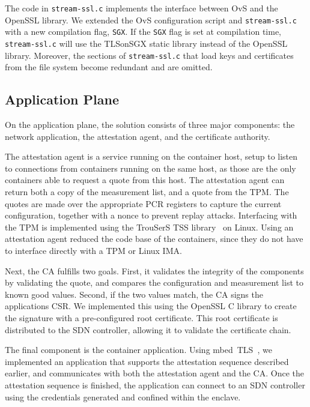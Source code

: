 {The code in \texttt{stream-ssl.c} implements the interface between OvS and the OpenSSL library. 
We extended the OvS configuration script and \texttt{stream-ssl.c} with a new compilation flag, \texttt{SGX}.
If the \texttt{SGX} flag is set at compilation time, \texttt{stream-ssl.c} will use the TLSonSGX static library instead of the OpenSSL library.
Moreover, the sections of \texttt{stream-ssl.c} that load keys and certificates from the file system become redundant and are omitted.

\subsection{Application Plane}
\label{subsec:trustanchors:appplane}
On the application plane, the solution consists of three major components: the network application, the attestation agent, and the certificate authority.

The attestation agent is a service running on the container host, setup to listen to connections from containers running on the same host, as those are the only containers able to request a quote from this host.
The attestation agent can return both a copy of the measurement list, and a quote from the TPM.
The quotes are made over the appropriate PCR registers to capture the current configuration, together with a nonce to prevent replay attacks.
Interfacing with the TPM is implemented using the TrouSerS TSS library~\cite{trousers} on Linux.
Using an attestation agent reduced the code base of the containers, since they do not have to interface directly with a TPM or Linux IMA.

Next, the CA fulfills two goals.
First, it validates the integrity of the components by validating the quote, and compares the configuration and measurement list to known good values.
Second, if the two values match, the CA signs the applications CSR.
We implemented this using the OpenSSL C library to create the signature with a pre-configured root certificate.
This root certificate is distributed to the SDN controller, allowing it to validate the certificate chain.

The final component is the container application.
Using mbed~TLS~\cite{mbedtls_sgx}, we implemented an application that supports the attestation sequence described earlier, and communicates with both the attestation agent and the CA.
Once the attestation sequence is finished, the application can connect to an SDN controller using the credentials generated and confined within the enclave.

}
